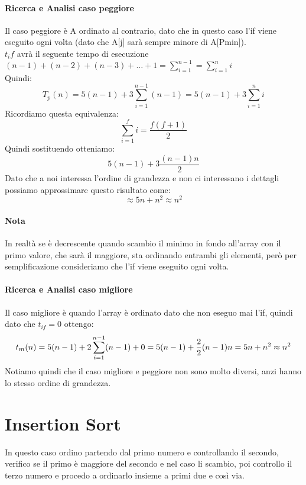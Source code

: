 \paragraph*{Ricerca e Analisi caso peggiore} Il caso peggiore è A ordinato al contrario,
dato che in questo caso l'if viene eseguito ogni volta (dato che A[j] sarà sempre minore di A[Pmin]).\\
$t_if$ avrà il seguente tempo di esecuzione $(n-1)+(n-2)+(n-3) + \dots + 1 = \sum_{i=1}^{n-1} = \sum_{i=1}^{n}i$\\
Quindi:
\begin{equation*}
    T_p(n) = 5(n-1) + 3\sum_{i=1}^{n-1}(n-1) = 5(n-1) + 3\sum_{i=1}^{n}i
\end{equation*}
Ricordiamo questa equivalenza:
\begin{equation*}
    \sum_{i=1}^{f}i = \frac{f(f+1)}{2}
\end{equation*}
Quindi sostituendo otteniamo:
\begin{equation*}
    5(n-1)+3\frac{(n-1)n}{2}
\end{equation*}
Dato che a noi interessa l'ordine di grandezza e non ci interessano i dettagli possiamo approssimare questo
risultato come:
\begin{equation*}
    \approx 5n + n^2 \approx n^2
\end{equation*}
\paragraph*{Nota} In realtà se è decrescente quando scambio il minimo in fondo all'array con il primo valore,
che sarà il maggiore, sta ordinando entrambi gli elementi, però per semplificazione consideriamo che
l'if viene eseguito ogni volta.
\paragraph*{Ricerca e Analisi caso migliore}
Il caso migliore è quando l'array è ordinato dato che non eseguo mai l'if, quindi dato che
$t_{if} = 0$ ottengo:
\begin{equation*}
    t_m(n) = 5(n-1) + 2 \sum_{i=1}^{n-1}(n-1)+0 = 5(n-1) + \frac{2}{2}(n-1)n = 5n +n^2\\
    \approx n^2
\end{equation*}
Notiamo quindi che il caso migliore e peggiore non sono molto diversi, anzi hanno lo stesso
ordine di grandezza.

\section*{Insertion Sort}
In questo caso ordino partendo dal primo numero e controllando il secondo, verifico se il primo
è maggiore del secondo e nel caso li scambio, poi controllo il terzo numero e procedo a ordinarlo
insieme a primi due e così via.
